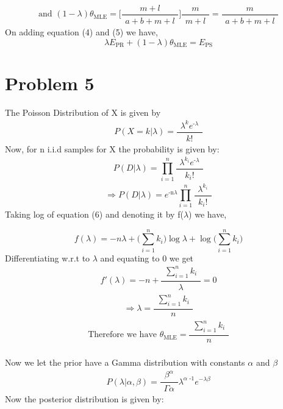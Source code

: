 \documentclass[11pt, a4paper, fleqn]{article}
\begin{document}
\begin{equation}
\text{and  } (1-\lambda) \theta_\text{MLE} = \Big[\frac{\substack{m+l}}{\substack{a+b+m+l}}\Big]  \frac{\substack{m}}{\substack{m+l}} 
= \frac{\substack{m}}{\substack{a+b+m+l}}
\end{equation}
On adding equation (4) and (5) we have, 
\begin{equation*}
 \lambda E_\text{PR} + (1-\lambda)\theta_\text{MLE} = E_\text{PS}
\end{equation*}
\newpage
\section{Problem 5}
The Poisson Distribution of X is given by
\begin{equation*}
P(X=k | \lambda) = \frac{\substack{\lambda^k e^\text{-$\lambda$}}}{\substack{k!}}
\end{equation*}
Now, for n i.i.d samples for X the probability is given by:
\begin{equation*}
P(D | \lambda) = \prod_{i=1}^{n}{\frac{\substack{\lambda^{k_i} e^\text{-$\lambda$}}}{\substack{k_i!}}}
\end{equation*}
\begin{equation}
\Rightarrow P(D | \lambda) =e^\text{-n$\lambda$} \prod_{i=1}^{n}\frac{\substack{\lambda^{k_i}}}{\substack{k_i!}}
\end{equation}
Taking log of equation (6) and denoting it by f($\lambda$) we have,

\begin{equation*}
f(\lambda) =-n\lambda + \Big(\sum_{i=1}^{n}{k_i}\Big) \log\lambda + \log\Big(\sum_{i=1}^{n}{k_i}\Big)
\end{equation*}
Differentiating w.r.t to $\lambda$ and equating to 0 we get
\begin{equation*}
f'(\lambda) =-n + \frac{\substack{\sum_{i=1}^{n}{k_i}}}{\substack{\lambda}} = 0
\end{equation*}
\begin{equation*}
\Rightarrow \lambda = \frac{\substack{\sum_{i=1}^{n}{k_i}}}{\substack{n}}
\end{equation*}
\begin{equation*}
\text{Therefore we have  }
\theta_\text{MLE} = \frac{\substack{\sum_{i=1}^{n}{k_i}}}{\substack{n}}
\end{equation*}
\\
Now we let the prior have a Gamma distribution with constants $\alpha$ and $\beta$
\begin{equation*}
P(\lambda|\alpha,\beta) = \frac{\substack{\beta^\alpha }}{\substack{\Gamma{\alpha}}} \lambda^\text{$\alpha$ -1} e^\text{$-\lambda\beta$}
\end{equation*}
Now the posterior distribution is given by:
\end{document}
